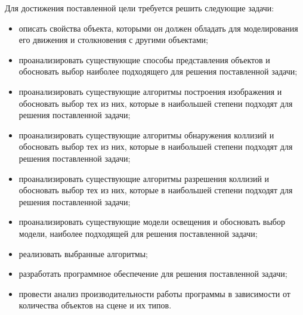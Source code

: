 Для достижения поставленной цели требуется решить следующие задачи:
\begin{itemize}
    \item описать свойства объекта, которыми он должен обладать для моделирования его движения и столкновения с другими объектами;
    \item проанализировать существующие способы представления объектов и обосновать выбор наиболее подходящего для решения поставленной задачи;
    \item проанализировать существующие алгоритмы построения изображения и обосновать выбор тех из них, которые в наибольшей степени подходят для решения поставленной задачи;
    \item проанализировать существующие алгоритмы обнаружения коллизий и обосновать выбор тех из них, которые в наибольшей степени подходят для решения поставленной задачи;
    \item проанализировать существующие алгоритмы разрешения коллизий и обосновать выбор тех из них, которые в наибольшей степени подходят для решения поставленной задачи;
    \item проанализировать существующие модели освещения и обосновать выбор модели, наиболее подходящей для решения поставленной задачи;
    \item реализовать выбранные алгоритмы;
    \item разработать программное обеспечение для решения поставленной задачи;
    \item провести анализ производительности работы программы в зависимости от количества объектов на сцене и их типов.
\end{itemize}
